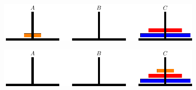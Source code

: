 \begin{frame}
  \begin{figure}[htbp]
    \centering
    \includegraphics[width=4in]{ch09/images/ht6.pdf}
  \end{figure}
\end{frame}

\begin{frame}
  \begin{figure}[htbp]
    \centering
    \includegraphics[width=4in]{ch09/images/ht7.pdf}
  \end{figure}
\end{frame}
